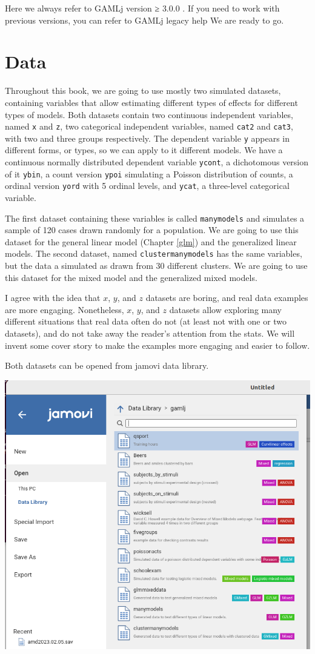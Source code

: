 \documentclass[
]{book}
\begin{document}
Here we always refer to { { GAMLj version ≥ } 3.0.0 }. If you need to work with previous versions, you can refer to GAMLj legacy help
We are ready to go.

\hypertarget{data}{%
\section{Data}\label{data}}

Throughout this book, we are going to use mostly two simulated datasets, containing variables that allow estimating different types of effects for different types of models. Both datasets contain two continuous independent variables, named \texttt{x} and \texttt{z}, two categorical independent variables, named \texttt{cat2} and \texttt{cat3}, with two and three groups respectively. The dependent variable \texttt{y} appears in different forms, or types, so we can apply to it different models. We have a continuous normally distributed dependent variable \texttt{ycont}, a dichotomous version of it \texttt{ybin}, a count version \texttt{ypoi} simulating a Poisson distribution of counts, a ordinal version \texttt{yord} with 5 ordinal levels, and \texttt{ycat}, a three-level categorical variable.

The first dataset containing these variables is called \texttt{manymodels} and simulates a sample of 120 cases drawn randomly for a population. We are going to use this dataset for the general linear model (Chapter \ref{glm}) and the generalized linear models. The second dataset, named \texttt{clustermanymodels} has the same variables, but the data a simulated as drawn from 30 different clusters. We are going to use this dataset for the mixed model and the generalized mixed models.

I agree with the idea that \(x\), \(y\), and \(z\) datasets are boring, and real data examples are more engaging. Nonetheless, \(x\), \(y\), and \(z\) datasets allow exploring many different situations that real data often do not (at least not with one or two datasets), and do not take away the reader's attention from the stats. We will invent some cover story to make the examples more engaging and easier to follow.

Both datasets can be opened from {jamovi} data library.

\includegraphics[width=0.7\linewidth]{bookletpics/0_datalibrary1}
\end{document}

